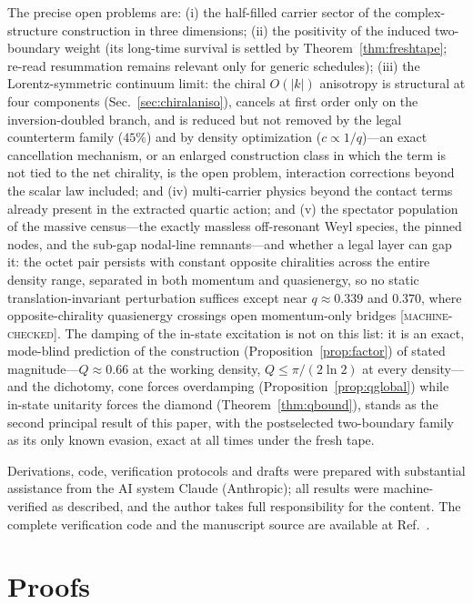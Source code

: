 \documentclass[aps,prd,twocolumn,superscriptaddress,nofootinbib,floatfix]{revtex4-2}
\newcommand{\evM}{\textnormal{\textsc{[machine-checked]}}}
\begin{document}
The precise open problems are: (i) the half-filled carrier sector of the
complex-structure construction in three dimensions; (ii) the positivity of the
induced two-boundary weight (its long-time survival is settled by
Theorem~\ref{thm:freshtape}; re-read resummation remains relevant only
for generic schedules);
(iii) the Lorentz-symmetric continuum limit: the chiral $O(|k|)$
anisotropy is structural at four components
(Sec.~\ref{sec:chiralaniso}), cancels at first order only on the
inversion-doubled branch, and is reduced but not removed by the legal
counterterm family ($45\%$) and by density optimization
($c\propto1/q$)---an exact cancellation mechanism, or an enlarged
construction class in which the term is not tied to the net chirality, is the open
problem, interaction corrections beyond the scalar law included; and
(iv) multi-carrier physics beyond the contact terms already present in the
extracted quartic action; and (v) the spectator population of the
massive census---the exactly massless off-resonant Weyl species, the
pinned nodes, and the sub-gap nodal-line remnants---and whether a legal
layer can gap it: the octet pair persists with constant opposite
chiralities across the entire density range, separated in both momentum
and quasienergy, so no static translation-invariant perturbation
suffices except near $q\approx0.339$ and $0.370$, where
opposite-chirality quasienergy crossings open momentum-only bridges
\evM{}. The damping of the in-state excitation is
not on this list: it is an exact, mode-blind prediction of the
construction (Proposition~\ref{prop:factor}) of stated
magnitude---$Q\approx0.66$ at the working density, $Q\le\pi/(2\ln2)$ at
every density---and the dichotomy, cone forces overdamping
(Proposition~\ref{prop:qglobal}) while in-state unitarity forces the
diamond (Theorem~\ref{thm:qbound}), stands as the
second principal result of this paper, with the postselected
two-boundary family as its only known evasion, exact at all times under
the fresh tape.

\begin{acknowledgments}
Derivations, code, verification protocols and drafts were prepared with
substantial assistance from the AI system Claude (Anthropic); all results
were machine-verified as described, and the author takes full
responsibility for the content. The complete verification code and the
manuscript source are available at Ref.~\cite{repo}.
\end{acknowledgments}


\appendix

\section{Proofs}
\label{app:proofs}
\end{document}
